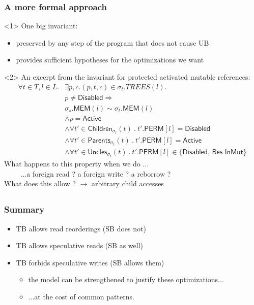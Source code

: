 \begin{frame}[fragile, t]
    \frametitle{A more formal approach}
    \begin{onlyenv}<1>
        One big invariant:
        \begin{itemize}
            \item preserved by any step of the program that does not cause UB
            \item provides sufficient hypotheses for the optimizations we want
        \end{itemize}
    \end{onlyenv}
    \begin{onlyenv}<2>
        An excerpt from the invariant for protected activated mutable references:
        \begin{align*}
            \forall t \in T, l \in L . 
            & \exists p, c . (p, t, c) \in \sigma_t.TREES(l). \\
            & p \ne \textsf{Disabled} \Rightarrow \\
            & \sigma_s.\textsf{MEM}(l) \sim \sigma_t.\textsf{MEM}(l) \\
            & \wedge p = \textsf{Active} \\
            & \wedge \forall t' \in \textsf{Children}_{\sigma_t}(t)\ .\ t'.\textsf{PERM}[l] = \textsf{Disabled} \\
            & \wedge \forall t' \in \textsf{Parents}_{\sigma_t}(t)\ .\ t'.\textsf{PERM}[l] = \textsf{Active} \\
            & \wedge \forall t' \in \textsf{Uncles}_{\sigma_t}(t)\ .\ t'.\textsf{PERM}[l] \in \{\textsf{Disabled, Res InMut}\}
        \end{align*}
        What happens to this property when we do ... \\
        \( \qquad \) ...a foreign read ? a foreign write ? a reborrow ? \\
        What does this allow ? \( \to \) arbitrary child accesses
    \end{onlyenv}
\end{frame}

\subsection*{}

\begin{frame}
    \frametitle{Summary}
    \begin{itemize}
        \item TB allows read reorderings (SB does not)
        \item TB allows speculative reads (SB as well)
        \item TB forbids speculative writes (SB allows them)
            \begin{itemize}
                \item the model can be strengthened to justify these optimizations...
                \item ...at the cost of common patterns.
            \end{itemize}
    \end{itemize}
\end{frame}
